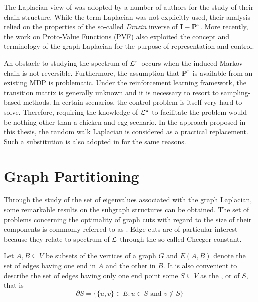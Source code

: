 The Laplacian view of \mdps was adopted by a number of authors \parencite{Lamond1989,
Puterman1994, Filar2007} for the study of their chain structure. While the term 
Laplacian was not explicitly used, their analysis relied on the
properties of the so-called \textit{Drazin} inverse \parencite{Drazin1958} of $\mathbf{I} -
\mathbf{P}^\pi$. More recently, the work on Proto-Value Functions (PVF) \parencite{Mahadevan2009}
also exploited the concept and terminology of the graph Laplacian for the purpose of representation
and control.

An obstacle to studying the spectrum of $\mathbf{\mathcal{L}}^\pi$ occurs when the induced Markov chain is not
reversible. Furthermore, the assumption that $\mathbf{P}^\pi$ is available from an
existing MDP is problematic. Under the reinforcement learning framework, the transition
matrix is generally unknown and it is necessary to resort to sampling-based methods. In
certain scenarios, the control problem is itself very hard to solve. Therefore, requiring
the knowledge of $\mathbf{\mathcal{L}}^\pi$ to facilitate the problem would be nothing other than a
chicken-and-egg scenario. In the approach proposed in this thesis, the random walk
Laplacian is considered as a practical replacement. Such a substitution
is also adopted in \cite{Mahadevan2009} for the same reasons.

\section{Graph Partitioning}
\label{sec:graph-partitioning}
Through the study of the set of eigenvalues associated with the graph Laplacian, some remarkable results on the subgraph structures can be obtained. The set of problems concerning the optimality of graph cuts with regard to the size of their components is commonly referred to as . Edge cuts are of particular interest because they relate to spectrum of $\mathbf{\mathcal{L}}$ through the so-called Cheeger constant. 

Let $A, B \subseteq V$ be subsets of the vertices of a graph $G$ and $E(A, B)$ denote the set of edges having one end in $A$ and the other in $B$. It is also convenient to describe the set of edges having only one end point some  $S \subseteq V$ as the  \parencite{Chung1994},  \parencite{Chung1997} or  \parencite{Mohar91} of $S$, that is
\begin{equation}
\partial S = \{ \{u, v\} \in E : u \in S \text{ and } v \not \in S \}
\end{equation}

